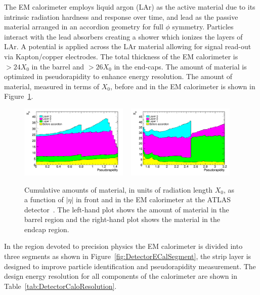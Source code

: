 The EM calorimeter employs liquid argon (LAr) as the active material due to its intrinsic radiation hardness and response over time, and lead as the passive material arranged in an accordion geometry for full $\phi$ symmetry. Particles interact with the lead absorbers creating a shower which ionizes the layers of LAr. A potential is applied across the LAr material allowing for signal read-out via Kapton/copper electrodes. The total thickness of the EM calorimeter is $>24X_{0}$ in the barrel and $>26X_{0}$ in the end-caps. The amount of material is optimized in pseudorapidity to enhance energy resolution. The amount of material, measured in terms of $X_{0}$, before and in the EM calorimeter is shown in Figure~\ref{fig:DetectorInteraction}.

\begin{figure}[htbp]
  \centering
  \includegraphics[width=0.46\textwidth]{PartDetector/Plots/x0_layers_barrel_csc03.pdf}
~%
  \includegraphics[width=0.46\textwidth]{PartDetector/Plots/x0_layers_endcap_csc03.pdf}
  \caption[Cumulative amounts of material, in units of radiation length $X_{0}$, as a function of $|\eta|$ in front and in the EM calorimeter at the ATLAS detector.]{Cumulative amounts of material, in units of radiation length $X_{0}$, as a function of $|\eta|$ in front and in the EM calorimeter at the ATLAS detector~\cite{Detector:ExpectedPerf}. The left-hand plot shows the amount of material in the barrel region and the right-hand plot shows the material in the endcap region.}\label{fig:DetectorInteraction}
\end{figure}

In the region devoted to precision physics the EM calorimeter is divided into three segments as shown in Figure~\ref{fig:DetectorECalSegment}, the strip layer is designed to improve particle identification and pseudorapidity measurement. The design energy resolution for all components of the calorimeter are shown in Table~\ref{tab:DetectorCaloResolution}.

